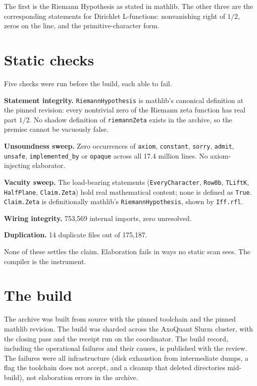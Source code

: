 \documentclass[11pt]{article}
\begin{document}
The first is the Riemann Hypothesis as stated in mathlib. The other three are the corresponding statements for Dirichlet L-functions: nonvanishing right of $1/2$, zeros on the line, and the primitive-character form.

\section{Static checks}
Five checks were run before the build, each able to fail.

\textbf{Statement integrity.} \texttt{RiemannHypothesis} is mathlib's canonical definition at the pinned revision: every nontrivial zero of the Riemann zeta function has real part $1/2$. No shadow definition of \texttt{riemannZeta} exists in the archive, so the premise cannot be vacuously false.

\textbf{Unsoundness sweep.} Zero occurrences of \texttt{axiom}, \texttt{constant}, \texttt{sorry}, \texttt{admit}, \texttt{unsafe}, \texttt{implemented\_by} or \texttt{opaque} across all 17.4 million lines. No axiom-injecting elaborator.

\textbf{Vacuity sweep.} The load-bearing statements (\texttt{EveryCharacter}, \texttt{Row0b}, \texttt{TLiftK}, \texttt{HalfPlane}, \texttt{Claim.Zeta}) hold real mathematical content; none is defined as \texttt{True}. \texttt{Claim.Zeta} is definitionally mathlib's \texttt{RiemannHypothesis}, shown by \texttt{Iff.rfl}.

\textbf{Wiring integrity.} 753,569 internal imports, zero unresolved.

\textbf{Duplication.} 14 duplicate files out of 175,187.

None of these settles the claim. Elaboration fails in ways no static scan sees. The compiler is the instrument.

\section{The build}
The archive was built from source with the pinned toolchain and the pinned mathlib revision. The build was sharded across the AxoQuant Slurm cluster, with the closing pass and the receipt run on the coordinator. The build record, including the operational failures and their causes, is published with the review. The failures were all infrastructure (disk exhaustion from intermediate dumps, a flag the toolchain does not accept, and a cleanup that deleted directories mid-build), not elaboration errors in the archive.
\end{document}

